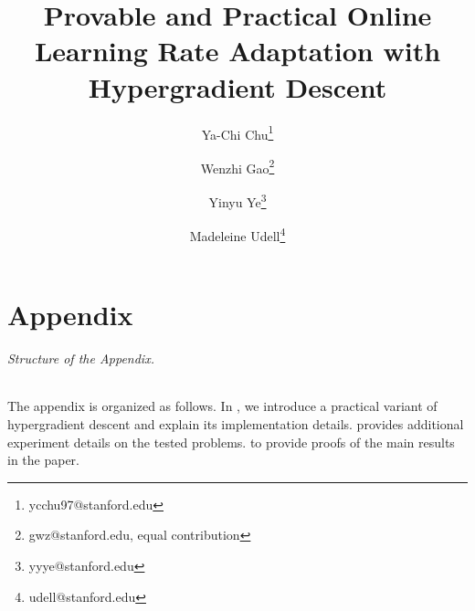 \documentclass[english,ruled]{article}
\theoremstyle{plain}
\theoremstyle{remark}
\theoremstyle{plain}
\theoremstyle{plain}
\theoremstyle{plain}
\theoremstyle{plain}
\theoremstyle{plain}
\begin{document}
\title{Provable and Practical Online Learning Rate Adaptation with Hypergradient Descent}

\author[1]{Ya-Chi Chu\thanks{ycchu97@stanford.edu}}
\author[2]{Wenzhi Gao\thanks{gwz@stanford.edu, equal contribution}}
\author[2,3]{Yinyu Ye\thanks{yyye@stanford.edu}}
\author[2,3]{Madeleine Udell\thanks{udell@stanford.edu}}

\maketitle









\newpage 
\renewcommand \thepart{}
\renewcommand \partname{}




\doparttoc
\faketableofcontents
\part{}

\newpage
\appendix
\onecolumn

\part{Appendix} 
\parttoc

\paragraph{Structure of the Appendix. } The appendix is organized as follows. In , we introduce a practical variant of hypergradient descent and explain its implementation details.  provides additional experiment details on the tested problems.  to  provide proofs of the main results in the paper.

\newpage

\newpage


\end{document}
